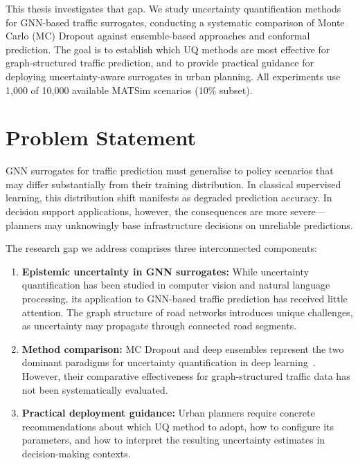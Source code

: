 This thesis investigates that gap. We study uncertainty quantification methods for GNN-based traffic surrogates, conducting a systematic comparison of Monte Carlo (MC) Dropout against ensemble-based approaches and conformal prediction. The goal is to establish which UQ methods are most effective for graph-structured traffic prediction, and to provide practical guidance for deploying uncertainty-aware surrogates in urban planning. All experiments use 1,000 of 10,000 available MATSim scenarios (10\% subset).

\section{Problem Statement}

GNN surrogates for traffic prediction must generalise to policy scenarios that may differ substantially from their training distribution. In classical supervised learning, this distribution shift manifests as degraded prediction accuracy. In decision support applications, however, the consequences are more severe---planners may unknowingly base infrastructure decisions on unreliable predictions.

The research gap we address comprises three interconnected components:

\begin{enumerate}
    \item \textbf{Epistemic uncertainty in GNN surrogates:} While uncertainty quantification has been studied in computer vision and natural language processing, its application to GNN-based traffic prediction has received little attention. The graph structure of road networks introduces unique challenges, as uncertainty may propagate through connected road segments.
    
    \item \textbf{Method comparison:} MC Dropout and deep ensembles represent the two dominant paradigms for uncertainty quantification in deep learning~\cite{gal2016dropout, lakshminarayanan2017simple}. However, their comparative effectiveness for graph-structured traffic data has not been systematically evaluated.
    
    \item \textbf{Practical deployment guidance:} Urban planners require concrete recommendations about which UQ method to adopt, how to configure its parameters, and how to interpret the resulting uncertainty estimates in decision-making contexts.
\end{enumerate}

